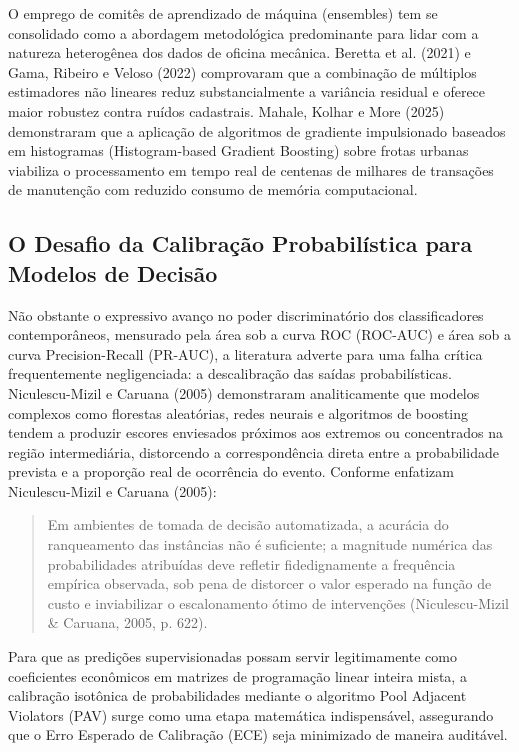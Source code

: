\documentclass[12pt,a4paper]{article}
\begin{document}
O emprego de comitês de aprendizado de máquina (ensembles) tem se consolidado como a abordagem metodológica predominante para lidar com a natureza heterogênea dos dados de oficina mecânica. Beretta et al. (2021) e Gama, Ribeiro e Veloso (2022) comprovaram que a combinação de múltiplos estimadores não lineares reduz substancialmente a variância residual e oferece maior robustez contra ruídos cadastrais. Mahale, Kolhar e More (2025) demonstraram que a aplicação de algoritmos de gradiente impulsionado baseados em histogramas (Histogram-based Gradient Boosting) sobre frotas urbanas viabiliza o processamento em tempo real de centenas de milhares de transações de manutenção com reduzido consumo de memória computacional.


\subsection{O Desafio da Calibração Probabilística para Modelos de Decisão}

Não obstante o expressivo avanço no poder discriminatório dos classificadores contemporâneos, mensurado pela área sob a curva ROC (ROC-AUC) e área sob a curva Precision-Recall (PR-AUC), a literatura adverte para uma falha crítica frequentemente negligenciada: a descalibração das saídas probabilísticas. Niculescu-Mizil e Caruana (2005) demonstraram analiticamente que modelos complexos como florestas aleatórias, redes neurais e algoritmos de boosting tendem a produzir escores enviesados próximos aos extremos ou concentrados na região intermediária, distorcendo a correspondência direta entre a probabilidade prevista e a proporção real de ocorrência do evento. Conforme enfatizam Niculescu-Mizil e Caruana (2005):

\begin{quote}
\small Em ambientes de tomada de decisão automatizada, a acurácia do ranqueamento das instâncias não é suficiente; a magnitude numérica das probabilidades atribuídas deve refletir fidedignamente a frequência empírica observada, sob pena de distorcer o valor esperado na função de custo e inviabilizar o escalonamento ótimo de intervenções (Niculescu-Mizil \& Caruana, 2005, p. 622).
\end{quote}

Para que as predições supervisionadas possam servir legitimamente como coeficientes econômicos em matrizes de programação linear inteira mista, a calibração isotônica de probabilidades mediante o algoritmo Pool Adjacent Violators (PAV) surge como uma etapa matemática indispensável, assegurando que o Erro Esperado de Calibração (ECE) seja minimizado de maneira auditável.
\end{document}
